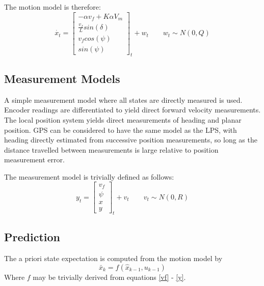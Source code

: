 \documentclass[11pt]{article} %
\begin{document}
The motion model is therefore:
\begin{equation}
\dot{x_t} = \left[ \begin{array}{c} 
-\alpha v_f + K \alpha V_m \\
\frac{v_f}{L} sin(\delta) \\
v_f cos( \psi ) \\
 sin( \psi )
\end{array} \right] _t + w_t \quad \quad w_t \sim N(0, Q)
\end{equation}


\subsection{Measurement Models}

A simple measurement model where all states are directly measured is used.  Encoder readings are differentiated to yield direct forward velocity measurements.
The local position system yields direct measurements of heading and planar position.  
GPS can be considered to have the same model as the LPS, with heading directly estimated from successive position measurements, so long as the distance travelled between measurements is large relative to position measurement error.

The measurement model is trivially defined as follows:
\begin{equation}
y_t = \left[ \begin{array}{c} v_f \\ \psi \\ x \\ y \end{array} \right]_t + v_t 
\quad \quad v_t \sim N(0,R)
\end{equation}

\subsection{Prediction}

The a priori state expectation is computed from the motion model by
\begin{equation}
\bar{x}_k = f(\hat{x}_{k-1}, u_{k-1})
\end{equation}
Where $f$ may be trivially derived from equations \ref{vf} - \ref{y}. 
\end{document}
